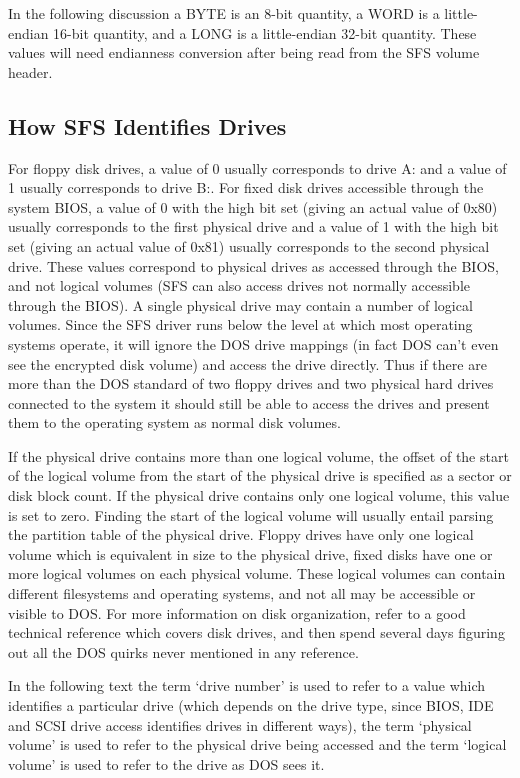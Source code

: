 In the following discussion a BYTE is an 8-bit quantity, a WORD is a
little-endian 16-bit quantity, and a LONG is a little-endian 32-bit quantity.  These 
values will need endianness conversion after being read from the SFS volume 
header.


\subsection{How SFS Identifies Drives}

For floppy disk drives, a value of 0 usually corresponds to drive A: and a
value of 1 usually corresponds to drive B:.  For fixed disk drives accessible
through the system BIOS, a value of 0 with the high bit set (giving an actual 
value of 0x80) usually corresponds to the first physical drive and a value of 1 
with the high bit set (giving an actual value of 0x81) usually corresponds to 
the second physical drive.  These values correspond to physical drives as
accessed through the BIOS, and not logical volumes (SFS can also access drives
not normally accessible through the BIOS).  A single physical drive may contain 
a number of logical volumes.  Since the SFS driver runs below the level at which 
most operating systems operate, it will ignore the DOS drive mappings (in fact 
DOS can't even see the encrypted disk volume) and access the drive directly.  
Thus if there are more than the DOS standard of two floppy drives and two 
physical hard drives connected to the system it should still be able to access 
the drives and present them to the operating system as normal disk volumes.

If the physical drive contains more than one logical volume, the offset of the
start of the logical volume from the start of the physical drive is specified
as a sector or disk block count.  If the physical drive contains only one 
logical volume, this value is set to zero.  Finding the start of the logical 
volume will usually entail parsing the partition table of the physical drive.  
Floppy drives have only one logical volume which is equivalent in size to the 
physical drive, fixed disks have one or more logical volumes on each physical 
volume.  These logical volumes can contain different filesystems and operating 
systems, and not all may be accessible or visible to DOS.  For more information 
on disk organization, refer to a good technical reference which covers disk 
drives, and then spend several days figuring out all the DOS quirks never 
mentioned in any reference.

In the following text the term `drive number' is used to refer to a value which
identifies a particular drive (which depends on the drive type, since BIOS, IDE
and SCSI drive access identifies drives in different ways), the term `physical 
volume' is used to refer to the physical drive being accessed and the term 
`logical volume' is used to refer to the drive as DOS sees it.


